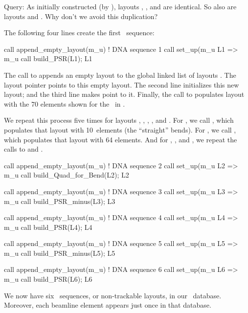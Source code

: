Query: As initially constructed (by ), layouts ,
, and  are identical. So also are layouts  and
. Why don't we avoid this duplication?%

%
The following four lines create the first \DNA\ sequence:
%
\begin{ptccode}
call append_empty_layout(m_u) ! DNA sequence 1
call set_up(m_u%
L1 => m_u%
call build_PSR(L1); L1%
\end{ptccode}
%
The call to  appends an empty layout to
the global linked list of layouts . The layout pointer
 points to this empty layout. The second line
initializes this new layout; and the third line makes  point
to it. Finally, the call to  populates layout 
with the 70 elements shown for the \PSR\ in .

We repeat this process five times for layouts , ,
, , and . For , we call
, which populates that layout with 10~elements
(the ``straight'' bends). For , we call ,
which populates that layout with 64 elements. And for ,
, and , we repeat the calls to  and
.
%
\begin{ptccode}
call append_empty_layout(m_u) ! DNA sequence 2
call set_up(m_u%
L2 => m_u%
call  build_Quad_for_Bend(L2); L2%

call append_empty_layout(m_u) ! DNA sequence 3
call set_up(m_u%
L3 => m_u%
call build_PSR_minus(L3); L3%

call append_empty_layout(m_u) ! DNA sequence 4
call set_up(m_u%
L4 => m_u%
call build_PSR(L4); L4%

call append_empty_layout(m_u) ! DNA sequence 5
call set_up(m_u%
L5 => m_u%
call build_PSR_minus(L5); L5%

call append_empty_layout(m_u) ! DNA sequence 6
call set_up(m_u%
L6 => m_u%
call build_PSR(L6); L6%
\end{ptccode}
%
We now have six \DNA\ sequences, or non-trackable layouts, in our
\DNA\ database. Moreover, each beamline element appears just once
in that database.

